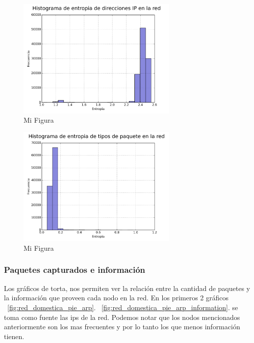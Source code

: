 \begin{figure}[h!]
  \centering
   \includegraphics[width=0.7\textwidth]{graficos/red_domestica_hist_arp.png}
  \caption{Mi Figura}
  \label{fig:red_domestica_hist_arp}
\end{figure}

\begin{figure}[h!]
  \centering
   \includegraphics[width=0.7\textwidth]{graficos/red_domestica_hist_type.png}
  \caption{Mi Figura}
  \label{fig:red_domestica_hist_type}
\end{figure}

\FloatBarrier

\subsubsection{Paquetes capturados e información}

Los gráficos de torta, nos permiten ver la relación entre la cantidad de paquetes y la información que proveen cada nodo en la red. 
En los primeros 2 gráficos ~\ref{fig:red_domestica_pie_arp}. ~\ref{fig:red_domestica_pie_arp_information}. se toma como fuente las ips de la red.
Podemos notar que los nodos mencionados anteriormente son los mas frecuentes y por lo tanto los que menos información tienen.

